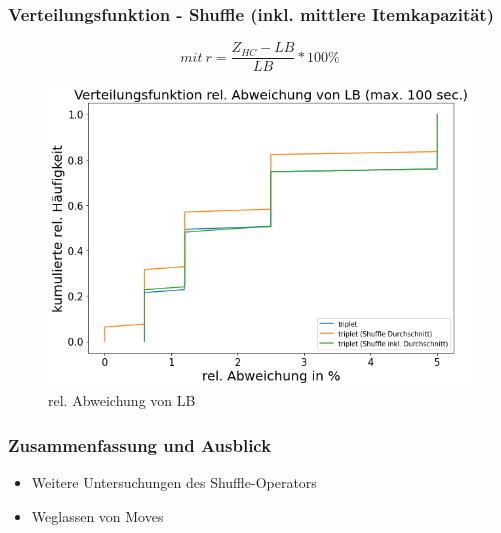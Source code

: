 \documentclass{beamer}
\begin{document}
\begin{frame}

\frametitle{Verteilungsfunktion - Shuffle (inkl. mittlere Itemkapazität)}

\begin{footnotesize}
\begin{equation}
mit \ r = \frac{Z_{HC}-LB}{LB} * 100\%
\end{equation}
\end{footnotesize}

\begin{figure}[!htbp]
\begin{center}
\includegraphics[scale=0.3]{img/dist9.png}
\end{center}
\caption{rel. Abweichung von LB}
\label{fig:architecture}
\end{figure}



\end{frame}

\begin{frame}
\frametitle{Zusammenfassung und Ausblick}
\begin{footnotesize}
\begin{itemize}
\item Weitere Untersuchungen des Shuffle-Operators
\item Weglassen von Moves
\end{itemize}
\end{footnotesize}
\end{frame}
\end{document}
